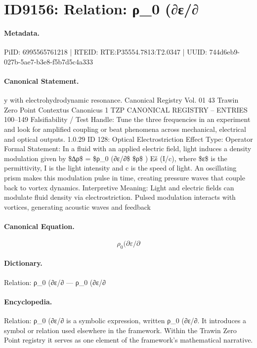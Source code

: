 \section*{ID9156: Relation: ρ\_0 (∂ε/∂}
\paragraph{Metadata.}
PiID: 6995565761218 | RTEID: RTE:P35554.7813:T2.0347 | UUID: 744d6eb9-027b-5ae7-b3e8-f5b7d5c4a333

\paragraph{Canonical Statement.}
y with electrohydrodynamic resonance. Canonical Registry Vol. 01 43 Trawin Zero Point Contextus Canonicus 1 TZP CANONICAL REGISTRY – ENTRIES 100–149 Falsifiability / Test Handle: Tune the three frequencies in an experiment and look for amplified coupling or beat phenomena across mechanical, electrical and optical outputs. 1.0.29 ID 128: Optical Electrostriction Effect Type: Operator Formal Statement: In a fluid with an applied electric field, light induces a density modulation given by \$∆ρ\$ = \$ρ\_0 (∂ε/∂\$ \$ρ\$ ) Eš (I/c), where \$ε\$ is the permittivity, I is the light intensity and c is the speed of light. An oscillating prism makes this modulation pulse in time, creating pressure waves that couple back to vortex dynamics. Interpretive Meaning: Light and electric fields can modulate fluid density via electrostriction. Pulsed modulation interacts with vortices, generating acoustic waves and feedback

\paragraph{Canonical Equation.}
\[
ρ_0 (∂ε/∂
\]

\paragraph{Dictionary.}
Relation: ρ\_0 (∂ε/∂ — ρ\_0 (∂ε/∂

\paragraph{Encyclopedia.}
Relation: ρ\_0 (∂ε/∂ is a symbolic expression, written ρ\_0 (∂ε/∂. It introduces a symbol or relation used elsewhere in the framework. Within the Trawin Zero Point registry it serves as one element of the framework's mathematical narrative.
